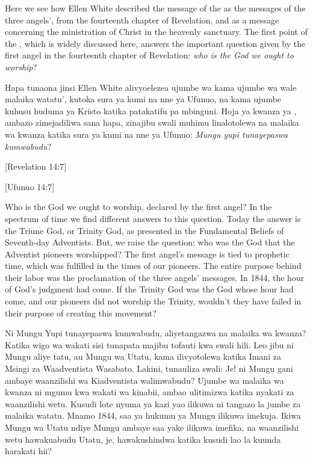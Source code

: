 Here we see how Ellen White described the message of the  as the messages of the three angels’, from the fourteenth chapter of Revelation, and as a message concerning the ministration of Christ in the heavenly sanctuary. The first point of the , which is widely discussed here, answers the important question given by the first angel in the fourteenth chapter of Revelation: \textit{who is the God we ought to worship}?


Hapa tunaona jinsi Ellen White alivyoelezea ujumbe wa  kama ujumbe wa wale malaika watatu’, kutoka sura ya kumi na nne ya Ufunuo, na kama ujumbe kuhusu huduma ya Kristo katika patakatifu pa mbinguni. Hoja ya kwanza ya , ambazo zimejadiliwa sana hapa, zinajibu swali muhimu linalotolewa na malaika wa kwanza katika sura ya kumi na nne ya Ufunuo: \textit{Mungu yupi tunayepaswa kumwabudu}?


[Revelation 14:7]


[Ufunuo 14:7]


Who is the God we ought to worship, declared by the first angel? In the spectrum of time we find different answers to this question. Today the answer is the Triune God, or Trinity God, as presented in the Fundamental Beliefs of Seventh-day Adventists. But, we raise the question: who was the God that the Adventist pioneers worshipped? The first angel’s message is tied to prophetic time, which was fulfilled in the times of our pioneers. The entire purpose behind their labor was the proclamation of the three angels’ messages. In 1844, the hour of God’s judgment had come. If the Trinity God was the God whose hour had come, and our pioneers did not worship the Trinity, wouldn't they have failed in their purpose of creating this movement?


Ni Mungu Yupi tunayepaswa kumwabudu, aliyetangazwa na malaika wa kwanza? Katika wigo wa wakati sisi tunapata majibu tofauti kwa swali hili. Leo jibu ni Mungu aliye tatu, au Mungu wa Utatu, kama ilivyotolewa katika Imani za Msingi za Waadventista Wasabato. Lakini, tunauliza swali: Je! ni Mungu gani ambaye waanzilishi wa Kiadventista walimwabudu? Ujumbe wa malaika wa kwanza ni mgumu kwa wakati wa kinabii, ambao ulitimizwa katika nyakati za waanzilishi wetu. Kusudi lote nyuma ya kazi yao ilikuwa ni tangazo la jumbe za malaika watatu. Mnamo 1844, saa ya hukumu ya Mungu ilikuwa imekuja. Ikiwa Mungu wa Utatu ndiye Mungu ambaye saa yake ilikuwa imefika, na waanzilishi wetu hawakuabudu Utatu, je, hawakushindwa katika kusudi lao la kuunda harakati hii?


